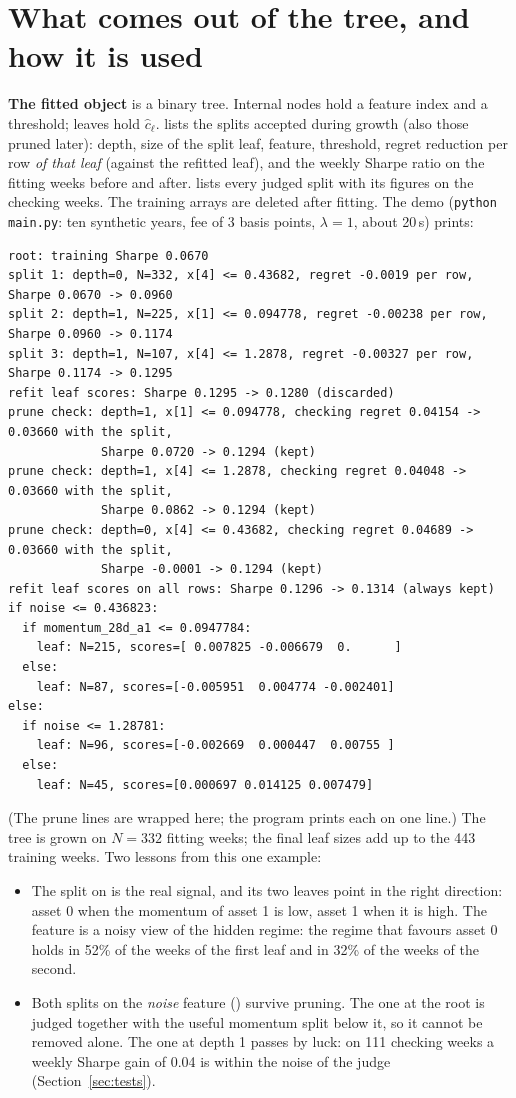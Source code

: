 \documentclass[11pt,a4paper]{article}
\newcommand{\1}{\mathbf{1}}
\newcommand{\code}[1]{\texttt{\detokenize{#1}}}
\begin{document}
\section{What comes out of the tree, and how it is used}\label{sec:output}

\textbf{The fitted object} is a binary tree. Internal nodes hold a feature index and a threshold; leaves hold $\hat c_\ell$. \code{growth_log} lists the splits accepted during growth (also those pruned later): depth, size of the split leaf, feature, threshold, regret reduction per row \emph{of that leaf} (against the refitted leaf), and the weekly Sharpe ratio on the fitting weeks before and after. \code{pruning_log} lists every judged split with its figures on the checking weeks. The training arrays are deleted after fitting. The demo (\texttt{python main.py}: ten synthetic years, fee of 3 basis points, $\lambda=1$, about 20\,s) prints:
{\footnotesize
\begin{verbatim}
root: training Sharpe 0.0670
split 1: depth=0, N=332, x[4] <= 0.43682, regret -0.0019 per row, Sharpe 0.0670 -> 0.0960
split 2: depth=1, N=225, x[1] <= 0.094778, regret -0.00238 per row, Sharpe 0.0960 -> 0.1174
split 3: depth=1, N=107, x[4] <= 1.2878, regret -0.00327 per row, Sharpe 0.1174 -> 0.1295
refit leaf scores: Sharpe 0.1295 -> 0.1280 (discarded)
prune check: depth=1, x[1] <= 0.094778, checking regret 0.04154 -> 0.03660 with the split,
             Sharpe 0.0720 -> 0.1294 (kept)
prune check: depth=1, x[4] <= 1.2878, checking regret 0.04048 -> 0.03660 with the split,
             Sharpe 0.0862 -> 0.1294 (kept)
prune check: depth=0, x[4] <= 0.43682, checking regret 0.04689 -> 0.03660 with the split,
             Sharpe -0.0001 -> 0.1294 (kept)
refit leaf scores on all rows: Sharpe 0.1296 -> 0.1314 (always kept)
if noise <= 0.436823:
  if momentum_28d_a1 <= 0.0947784:
    leaf: N=215, scores=[ 0.007825 -0.006679  0.      ]
  else:
    leaf: N=87, scores=[-0.005951  0.004774 -0.002401]
else:
  if noise <= 1.28781:
    leaf: N=96, scores=[-0.002669  0.000447  0.00755 ]
  else:
    leaf: N=45, scores=[0.000697 0.014125 0.007479]
\end{verbatim}
}
(The prune lines are wrapped here; the program prints each on one line.) The tree is grown on $N=332$ fitting weeks; the final leaf sizes add up to the 443 training weeks. Two lessons from this one example:
\begin{itemize}
\item The split on \code{momentum_28d_a1} is the real signal, and its two leaves point in the right direction: asset 0 when the momentum of asset 1 is low, asset 1 when it is high. The feature is a noisy view of the hidden regime: the regime that favours asset 0 holds in 52\% of the weeks of the first leaf and in 32\% of the weeks of the second.
\item Both splits on the \emph{noise} feature (\code{x[4]}) survive pruning. The one at the root is judged together with the useful momentum split below it, so it cannot be removed alone. The one at depth 1 passes by luck: on 111 checking weeks a weekly Sharpe gain of 0.04 is within the noise of the judge (Section~\ref{sec:tests}).
\end{itemize}
\end{document}
